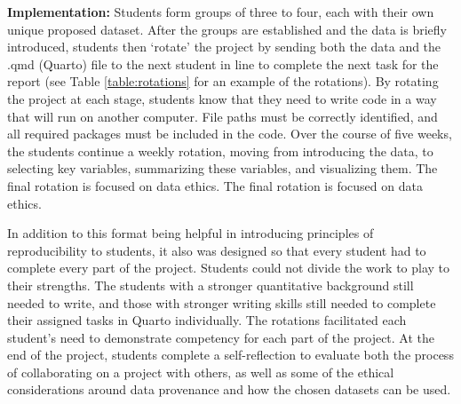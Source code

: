 \documentclass[
  12pt]{article}
\begin{document}
\textbf{Implementation:} Students form groups of three to four, each with their own unique proposed dataset.
After the groups are established and the data is briefly introduced, students then `rotate' the project by sending both the data and the .qmd (Quarto) file to the next student in line to complete the next task for the report (see Table \ref{table:rotations} for an example of the rotations).
By rotating the project at each stage, students know that they need to write code in a way that will run on another computer.
File paths must be correctly identified, and all required packages must be included in the code.
Over the course of five weeks, the students continue a weekly rotation, moving from introducing the data, to selecting key variables, summarizing these variables, and visualizing them. The final rotation is focused on data ethics. 
The final rotation is focused on data ethics.

In addition to this format being helpful in introducing principles of reproducibility to students, it also was designed so that every student had to complete every part of the project.
Students could not divide the work to play to their strengths.
The students with a stronger quantitative background still needed to write, and those with stronger writing skills still needed to complete their assigned tasks in Quarto individually.
The rotations facilitated each student's need to demonstrate competency for each part of the project.
At the end of the project, students complete a self-reflection to evaluate both the process of collaborating on a project with others, as well as some of the ethical considerations around data provenance and how the chosen datasets can be used. 



\begin{table}[ht]
\caption{Sample Project Rotations for a Group of Three Students}
\label{table:rotations}
\end{table}
\end{document}
